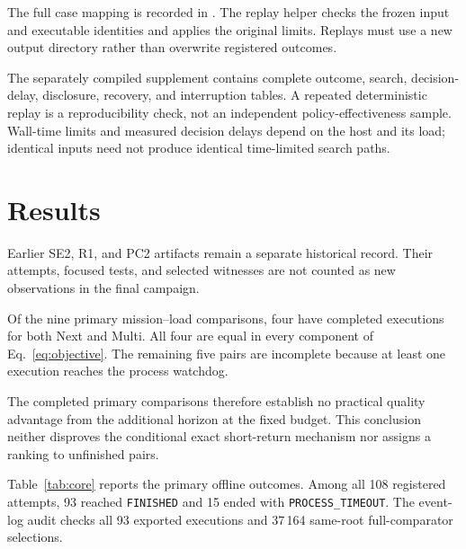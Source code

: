 \documentclass[conference]{IEEEtran}
\newcommand{\op}[1]{\texttt{#1}}
\begin{document}
The full case mapping is recorded in
.
The replay helper
checks the frozen input and executable identities and applies
the original limits.
Replays must use a new output directory rather than overwrite
registered outcomes.

The separately compiled supplement contains complete outcome,
search, decision-delay, disclosure, recovery, and interruption
tables.
A repeated deterministic replay is a reproducibility check,
not an independent policy-effectiveness sample.
Wall-time limits and measured decision delays depend on
the host and its load; identical inputs need not produce
identical time-limited search paths.


\FloatBarrier


\section{Results}
\label{sec:results}

Earlier SE2, R1, and PC2 artifacts remain a separate historical
record.
Their attempts, focused tests, and selected witnesses are not
counted as new observations in the final campaign.

Of the nine primary mission--load comparisons, four have
completed executions for both Next and Multi.
All four are equal in every component of
Eq.~\eqref{eq:objective}.
The remaining five pairs are incomplete because at least one
execution reaches the process watchdog.

The completed primary comparisons therefore establish no
practical quality advantage from the additional horizon at
the fixed budget.
This conclusion neither disproves the conditional exact
short-return mechanism nor assigns a ranking to unfinished
pairs.

Table~\ref{tab:core} reports the primary offline outcomes.
Among all 108 registered attempts, 93 reached
\op{FINISHED} and 15 ended with
\op{PROCESS\_TIMEOUT}.
The event-log audit checks all 93 exported executions and
37\,164 same-root full-comparator selections.
\end{document}
